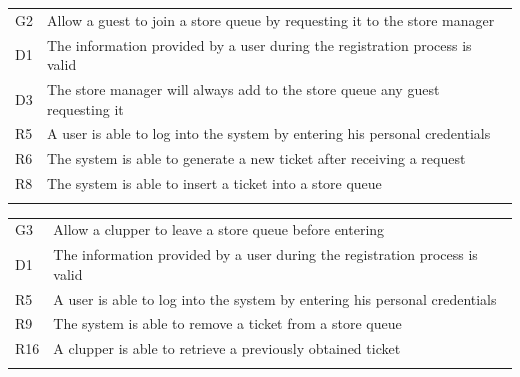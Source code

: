 \begin{longtable}[]{@{}
  >{\raggedright\arraybackslash}p{}
  >{\raggedright\arraybackslash}p{}@{}}
\toprule
G2 & Allow a guest to join a store queue by requesting it to the store
manager \\ \addlinespace
\midrule
\endhead
D1 & The information provided by a user during the registration process
is valid \\ \addlinespace
D3 & The store manager will always add to the store queue any guest
requesting it \\ \addlinespace
R5 & A user is able to log into the system by entering his personal
credentials \\ \addlinespace
R6 & The system is able to generate a new ticket after receiving a
request \\ \addlinespace
R8 & The system is able to insert a ticket into a store
queue \\ \addlinespace
\bottomrule
\end{longtable}

\begin{longtable}[]{@{}
  >{\raggedright\arraybackslash}p{}
  >{\raggedright\arraybackslash}p{}@{}}
\toprule
G3 & Allow a clupper to leave a store queue before
entering \\ \addlinespace
\midrule
\endhead
D1 & The information provided by a user during the registration process
is valid \\ \addlinespace
R5 & A user is able to log into the system by entering his personal
credentials \\ \addlinespace
R9 & The system is able to remove a ticket from a store
queue \\ \addlinespace
R16 & A clupper is able to retrieve a previously obtained
ticket \\ \addlinespace
\bottomrule
\end{longtable}

